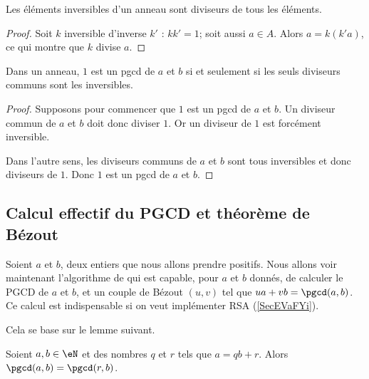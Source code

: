 \begin{lemma}
	Les éléments inversibles d'un anneau sont diviseurs de tous les éléments.
\end{lemma}

\begin{proof}
	Soit \( k\) inversible d'inverse \( k'\) : \( kk'=1\); soit aussi \( a\in A\). Alors \( a=k(k'a)\), ce qui montre que \( k\) divise \( a\).
\end{proof}

\begin{lemma}
	Dans un anneau, \( 1\) est un pgcd de \( a\) et \( b\) si et seulement si les seuls diviseurs communs sont les inversibles.
\end{lemma}

\begin{proof}
	Supposons pour commencer que \( 1\) est un pgcd de \( a\) et \( b\). Un diviseur commun de \( a\) et \( b\) doit donc diviser \( 1\). Or un diviseur de \( 1\) est forcément inversible.

	Dans l'autre sens, les diviseurs communs de \( a\) et \( b\) sont tous inversibles et donc diviseurs de \( 1\). Donc \( 1\) est un pgcd de \( a\) et \( b\).
\end{proof}

\subsection{Calcul effectif du PGCD et théorème de Bézout}
\label{subSecIpmnhO}

Soient \( a\) et \( b\), deux entiers que nous allons prendre positifs. Nous allons voir maintenant l'algorithme de  qui est capable, pour \( a\) et \( b\) donnés, de calculer le PGCD de \( a\) et \( b\), et un couple de Bézout \( (u,v)\) tel que \( ua+vb=\pgcd(a,b)\). Ce calcul est indispensable si on veut implémenter RSA (\ref{SecEVaFYi}).

Cela se base sur le lemme suivant.

\begin{lemma}       \label{LemiVqita}
	Soient \( a,b\in \eN\) et des nombres \( q\) et \( r\) tels que \( a=qb+r\). Alors \( \pgcd(a,b)=\pgcd(r,b)\).
\end{lemma}

